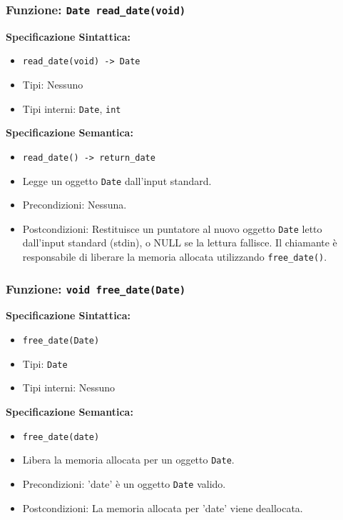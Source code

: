 \documentclass[11pt]{scrartcl} %
\begin{document}
\subsubsection{Funzione: \texttt{Date read\_date(void)}}

\textbf{Specificazione Sintattica:}
\begin{itemize}
	\item \texttt{read\_date(void) -> Date}
	\item Tipi: Nessuno
	\item Tipi interni: \texttt{Date}, \texttt{int}
\end{itemize}

\textbf{Specificazione Semantica:}
\begin{itemize}
	\item \texttt{read\_date() -> return\_date}
	\item Legge un oggetto \texttt{Date} dall'input standard.
	\item Precondizioni: Nessuna.
	\item Postcondizioni: Restituisce un puntatore al nuovo oggetto \texttt{Date} letto dall'input standard (stdin), o NULL se la lettura fallisce. Il chiamante è responsabile di liberare la memoria allocata utilizzando \texttt{free\_date()}.
\end{itemize}

\subsubsection{Funzione: \texttt{void free\_date(Date)}}

\textbf{Specificazione Sintattica:}
\begin{itemize}
	\item \texttt{free\_date(Date)}
	\item Tipi: \texttt{Date}
	\item Tipi interni: Nessuno
\end{itemize}

\textbf{Specificazione Semantica:}
\begin{itemize}
	\item \texttt{free\_date(date)}
	\item Libera la memoria allocata per un oggetto \texttt{Date}.
	\item Precondizioni: 'date' è un oggetto \texttt{Date} valido.
	\item Postcondizioni: La memoria allocata per 'date' viene deallocata.
\end{itemize}
\end{document}
